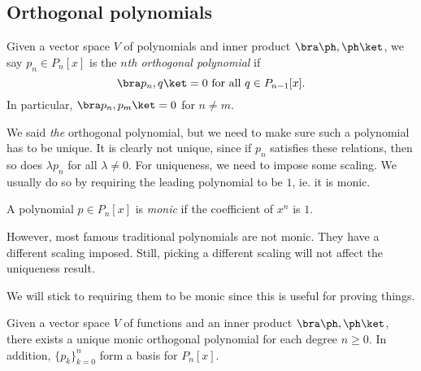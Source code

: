 \documentclass[a4paper]{article}
\begin{document}
\subsection{Orthogonal polynomials}
\begin{defi}
  Given a vector space $V$ of polynomials and inner product $\bra \ph, \ph\ket$, we say $p_n \in P_n[x]$ is the \emph{$n$th orthogonal polynomial} if
  \[
    \bra p_n, q\ket = 0\text{ for all }q \in P_{n - 1}[x].
  \]
  In particular, $\bra p_n, p_m\ket = 0$ for $n \not= m$.
\end{defi}

We said \emph{the} orthogonal polynomial, but we need to make sure such a polynomial has to be unique. It is clearly not unique, since if $p_n$ satisfies these relations, then so does $\lambda p_n$ for all $\lambda \not= 0$. For uniqueness, we need to impose some scaling. We usually do so by requiring the leading polynomial to be $1$, ie. it is monic.

\begin{defi}
  A polynomial $p \in P_n[x]$ is \emph{monic} if the coefficient of $x^n$ is $1$.
\end{defi}
However, most famous traditional polynomials are not monic. They have a different scaling imposed. Still, picking a different scaling will not affect the uniqueness result.

We will stick to requiring them to be monic since this is useful for proving things.

\begin{thm}
  Given a vector space $V$ of functions and an inner product $\bra \ph, \ph \ket$, there exists a unique monic orthogonal polynomial for each degree $n \geq 0$. In addition, $\{p_k\}_{k = 0}^n$ form a basis for $P_n[x]$.
\end{thm}
\end{document}
